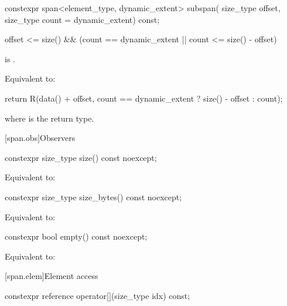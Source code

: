 %
\begin{itemdecl}
constexpr span<element_type, dynamic_extent> subspan(
  size_type offset, size_type count = dynamic_extent) const;
\end{itemdecl}

\begin{itemdescr}
\pnum
\hardexpects
\begin{codeblock}
offset <= size() && (count == dynamic_extent || count <= size() - offset)
\end{codeblock}
is .

\pnum
\effects
Equivalent to:
\begin{codeblock}
return R(data() + offset, count == dynamic_extent ? size() - offset : count);
\end{codeblock}
where  is the return type.
\end{itemdescr}

[span.obs]{Observers}

%
\begin{itemdecl}
constexpr size_type size() const noexcept;
\end{itemdecl}

\begin{itemdescr}
\pnum
\effects
Equivalent to: 
\end{itemdescr}

%
\begin{itemdecl}
constexpr size_type size_bytes() const noexcept;
\end{itemdecl}

\begin{itemdescr}
\pnum
\effects
Equivalent to: 
\end{itemdescr}

%
\begin{itemdecl}
constexpr bool empty() const noexcept;
\end{itemdecl}

\begin{itemdescr}
\pnum
\effects
Equivalent to: 
\end{itemdescr}

[span.elem]{Element access}

%
\begin{itemdecl}
constexpr reference operator[](size_type idx) const;
\end{itemdecl}

